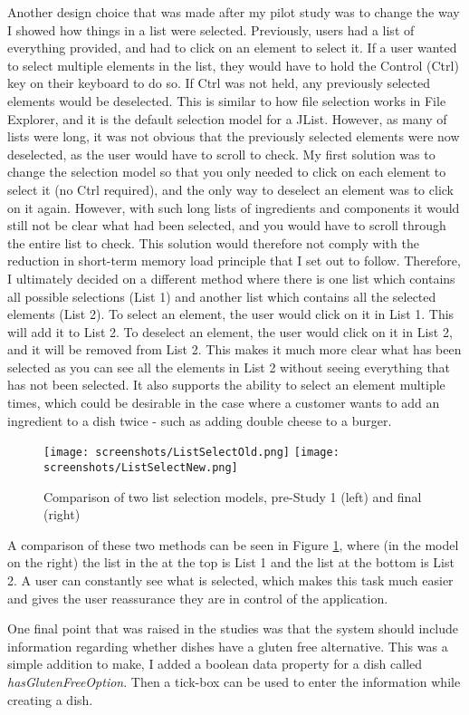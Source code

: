 Another design choice that was made after my pilot study was to change the way I showed how things in a list were selected. Previously, users had a list of everything provided, and had to click on an element to select it. If a user wanted to select multiple elements in the list, they would have to hold the Control (Ctrl) key on their keyboard to do so. If Ctrl was not held, any previously selected elements would be deselected. This is similar to how file selection works in File Explorer, and it is the default selection model for a JList. However, as many of lists were long, it was not obvious that the previously selected elements were now deselected, as the user would have to scroll to check. My first solution was to change the selection model so that you only needed to click on each element to select it (no Ctrl required), and the only way to deselect an element was to click on it again. However, with such long lists of ingredients and components it would still not be clear what had been selected, and you would have to scroll through the entire list to check. This solution would therefore not comply with the reduction in short-term memory load principle that I set out to follow. Therefore, I ultimately decided on a different method where there is one list which contains all possible selections (List 1) and another list which contains all the selected elements (List 2). To select an element, the user would click on it in List 1. This will add it to List 2. To deselect an element, the user would click on it in List 2, and it will be removed from List 2. This makes it much more clear what has been selected as you can see all the elements in List 2 without seeing everything that has not been selected. It also supports the ability to select an element multiple times, which could be desirable in the case where a customer wants to add an ingredient to a dish twice - such as adding double cheese to a burger. 

\begin{figure}[h]
    \centering
    \captionsetup{justification=centering}
    \texttt{[image: screenshots/ListSelectOld.png]}
    \texttt{[image: screenshots/ListSelectNew.png]}
    \caption[Comparison of two list selection models]{Comparison of two list selection models, pre-Study 1 (left) and final (right)}
    \label{fig:list_selection_comparison}
\end{figure}

A comparison of these two methods can be seen in Figure \ref{fig:list_selection_comparison}, where (in the model on the right) the list in the at the top is List 1 and the list at the bottom is List 2. A user can constantly see what is selected, which makes this task much easier and gives the user reassurance they are in control of the application.


One final point that was raised in the studies was that the system should include information regarding whether dishes have a gluten free alternative. This was a simple addition to make, I added a boolean data property for a dish called \textit{hasGlutenFreeOption}. Then a tick-box can be used to enter the information while creating a dish.

